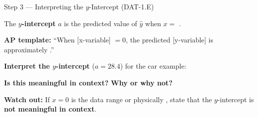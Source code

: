 \documentclass[10pt]{article}
\begin{document}
\vspace{0.1in}

\begin{notesbox}{Step 3 --- Interpreting the $y$-Intercept (DAT-1.E)}
\small

\noindent The \textbf{$y$-intercept} $a$ is the predicted value of $\hat{y}$ when $x = $ .

\vspace{6pt}
\textbf{AP template:} ``When [x-variable] $= 0$, the predicted [y-variable] is approximately
.''

\vspace{8pt}
\textbf{Interpret the $y$-intercept} ($a = 28.4$) for the car example:
\vspace{4pt}\\

\vspace{6pt}
\textbf{Is this meaningful in context?}  \quad \textbf{Why or why not?}\\[6pt]

\vspace{4pt}
\begin{tcolorbox}[colback=redbg, colframe=redacc, boxrule=0.8pt, arc=2mm,
    left=3mm, right=3mm, top=2mm, bottom=2mm]
\small\textbf{Watch out:} If $x = 0$ is  the data range or physically
, state that the $y$-intercept is \textbf{not meaningful in context}.
\end{tcolorbox}

\end{notesbox}

\vspace{0.1in}
\end{document}

